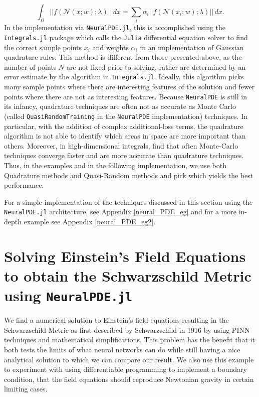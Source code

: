 \documentclass{CUP-JNL-DTM}%
\theoremstyle{definition}
\numberwithin{equation}{section}
\newcommand{\Julia}{\texttt{Julia} }
\newcommand{\net}{\mathcal{N}}
\begin{document}
\begin{equation}
	\int_{\Omega} ||f(\net(x;w); \lambda)||\,dx = \sum_i \alpha_i ||f(\net(x_i;w); \lambda)||\,dx.
\end{equation}
In the implementation via \texttt{NeuralPDE.jl}, this is accomplished using the \texttt{Integrals.jl} package which calls the \Julia differential equation solver \cite{rackauckasDifferentialEquationsJlPerformant2017} to find the correct sample points $x_i$ and weights $\alpha_i$ in an implementation of Gaussian quadrature rules. This method is different from those presented above, as the number of points $N$ are not fixed prior to solving, rather are determined by an error estimate by the algorithm in \texttt{Integrals.jl}. Ideally, this algorithm picks many sample points where there are interesting features of the solution and fewer points where there are not as interesting features. Because \texttt{NeuralPDE} is still in its infancy, quadrature techniques are often not as accurate as Monte Carlo (called \texttt{QuasiRandomTraining} in the \texttt{NeuralPDE} implementation) techniques. In particular, with the addition of complex additional-loss terms, the quadrature algorithm is not able to identify which areas in space are more important than others. Moreover, in high-dimensional integrals, \cite{riveraQuadratureRulesSolving2022} find that often Monte-Carlo techniques converge faster and are more accurate than quadrature techniques. Thus, in the examples and in the following implementation, we use both Quadrature methods and Quasi-Random methods and pick which yields the best performance. 

For a simple implementation of the techniques discussed in this section using the \texttt{NeuralPDE.jl} architecture, see Appendix \ref{neural_PDE_eg} and for a more in-depth example see Appendix \ref{neural_PDE_eg2}. 


\section{Solving Einstein's Field Equations to obtain the Schwarzschild Metric using \texttt{NeuralPDE.jl}}
\label{sec:EFE}

We find a numerical solution to Einstein's field equations resulting in the Schwarzschild Metric as first described by Schwarzschild in 1916 \cite{schwarzschildGravitationalFieldMass1999} by using PINN techniques and mathematical simplifications. This problem has the benefit that it both tests the limits of what neural networks can do while still having a nice analytical solution to which we can compare our result. We also use this example to experiment with using differentiable programming to implement a boundary condition, that the field equations should reproduce Newtonian gravity in certain limiting cases.
\end{document}
